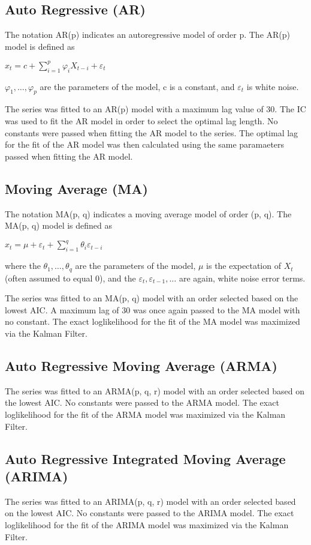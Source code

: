 \subsection{Auto Regressive (AR)}
The notation AR(p) indicates an autoregressive model of order p. The AR(p) model is defined as

\(x_t = c+ \sum^{p}_{i=1} \varphi_iX_{t-i} + \varepsilon_t\)

\(\varphi_1, \ldots, \varphi_p\) are the parameters of the model, c is a constant, and \(\varepsilon_t\) is white noise.

The series was fitted to an AR(p) model with a maximum lag value of 30. The IC was used to fit the AR model in order to select the optimal lag length. No constants were passed when fitting the AR model to the series. The optimal lag for the fit of the AR model was then calculated using the same paramaeters passed when fitting the AR model.

\subsection{Moving Average (MA)}
The notation MA(p, q) indicates a moving average model of order (p, q). The MA(p, q) model is defined as

\(x_t = \mu+\varepsilon_t+\sum^{q}_{i=1} \theta_i\varepsilon_{t-i}\)

where the \(\theta_1, \dots, \theta_q\) are the parameters of the model, $\mu$ is the expectation of $X_t$ (often assumed to equal 0), and the \(\varepsilon_t, \varepsilon_{t-1},\dots\) are again, white noise error terms.

The series was fitted to an MA(p, q) model with an order selected based on the lowest AIC. A maximum lag of 30 was once again passed to the MA model with no constant. The exact loglikelihood for the fit of the MA model was maximized via the Kalman Filter.

\subsection{Auto Regressive Moving Average (ARMA)}
The series was fitted to an ARMA(p, q, r) model with an order selected based on the lowest AIC. No constants were passed to the ARMA model. The exact loglikelihood for the fit of the ARMA model was maximized via the Kalman Filter.

\subsection{Auto Regressive Integrated Moving Average (ARIMA)}
The series was fitted to an ARIMA(p, q, r) model with an order selected based on the lowest AIC. No constants were passed to the ARIMA model. The exact loglikelihood for the fit of the ARIMA model was maximized via the Kalman Filter.

